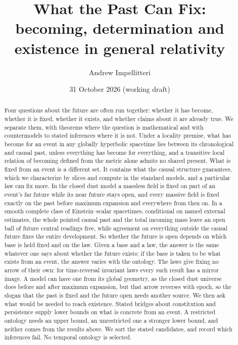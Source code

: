 \documentclass[11pt]{article}
\title{What the Past Can Fix:\\[2pt]
\large becoming, determination and existence in general relativity}
\author{Andrew Impellitteri}
\date{31 October 2026 (working draft)}
\theoremstyle{definition}
\begin{document}
\maketitle

\begin{abstract}
Four questions about the future are often run together: whether it has become,
whether it is fixed, whether it exists, and whether claims about it are already
true. We separate them, with theorems where the question is mathematical and with countermodels to stated inferences where it is not. Under a locality premise, what has become
for an event in any globally hyperbolic spacetime lies between its chronological
and causal past, unless everything has become for everything, and a transitive local relation of becoming defined from the metric alone admits no shared present. What is fixed
from an event is a different set. It contains what the causal structure
guarantees, which we characterize by slices and compute in the standard models,
and a particular law can fix more. In the closed dust model a massless field is
fixed on part of an event's far future while its near future stays open, and every
massive field is fixed exactly on the past before maximum expansion and
everywhere from then on. In a smooth complete class of Einstein--scalar
spacetimes, conditional on named external estimates, the whole pointed causal
past and the total incoming mass leave an open ball of future central readings
free, while agreement on everything outside the causal future fixes the entire
development. So whether the future is open depends on which base is held fixed and on the law. Given a base and a law, the answer is the same whatever one says about whether the future exists; if the base is taken to be what exists from an event, the answer varies with the ontology. The laws give fixing no arrow of their own: for time-reversal invariant laws every such result has a mirror image. A model can have one from its global geometry, as the closed dust universe does before and after maximum expansion, but that arrow reverses with epoch, so the slogan that the past is fixed and the future open needs another source. We then ask what would be needed to reach existence. Stated bridges about constitution and persistence supply lower bounds on what is concrete from an event. A restricted ontology needs an upper bound, an
unrestricted one a stronger lower bound, and neither comes from the results
above. We sort the stated candidates, and record which inferences fail.
No temporal ontology is selected.
\end{abstract}
\end{document}
